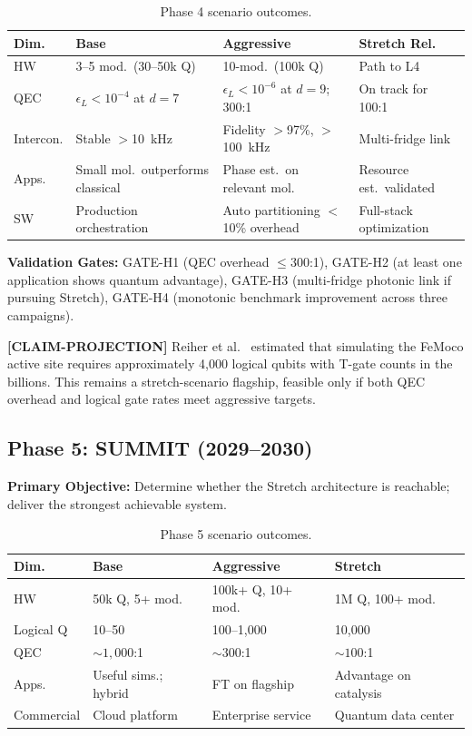 \documentclass[conference]{IEEEtran}
\begin{document}
\begin{table}[H]
\centering
\caption{Phase 4 scenario outcomes.}
\begin{tabular}{@{}l L{2cm} L{2cm} L{2cm}@{}}
\toprule
\textbf{Dim.} & \textbf{Base} & \textbf{Aggressive} & \textbf{Stretch Rel.} \\
\midrule
HW & 3--5 mod.\ (30--50k Q) & 10-mod.\ (100k Q) & Path to L4 \\
QEC & $\epsilon_L < 10^{-4}$ at $d{=}7$ & $\epsilon_L < 10^{-6}$ at $d{=}9$; 300:1 & On track for 100:1 \\
Intercon. & Stable $>$10~kHz & Fidelity $>$97\%, $>$100~kHz & Multi-fridge link \\
Apps. & Small mol.\ outperforms classical & Phase est.\ on relevant mol. & Resource est.\ validated \\
SW & Production orchestration & Auto partitioning $<$10\% overhead & Full-stack optimization \\
\bottomrule
\end{tabular}
\end{table}

\textbf{Validation Gates:} GATE-H1 (QEC overhead $\leq 300$:1), GATE-H2 (at least one application shows quantum advantage), GATE-H3 (multi-fridge photonic link if pursuing Stretch), GATE-H4 (monotonic benchmark improvement across three campaigns).

\textbf{[CLAIM-PROJECTION]} Reiher et al.~\cite{reiher2017} estimated that simulating the FeMoco active site requires approximately 4,000 logical qubits with T-gate counts in the billions. This remains a stretch-scenario flagship, feasible only if both QEC overhead and logical gate rates meet aggressive targets.

\subsection{Phase 5: SUMMIT (2029--2030)}

\textbf{Primary Objective:} Determine whether the Stretch architecture is reachable; deliver the strongest achievable system.

\begin{table}[H]
\centering
\caption{Phase 5 scenario outcomes.}
\begin{tabular}{@{}l L{2cm} L{2cm} L{2cm}@{}}
\toprule
\textbf{Dim.} & \textbf{Base} & \textbf{Aggressive} & \textbf{Stretch} \\
\midrule
HW & 50k Q, 5+ mod. & 100k+ Q, 10+ mod. & 1M Q, 100+ mod. \\
Logical Q & 10--50 & 100--1,000 & 10,000 \\
QEC & ${\sim}1{,}000$:1 & ${\sim}300$:1 & ${\sim}100$:1 \\
Apps. & Useful sims.; hybrid & FT on flagship & Advantage on catalysis \\
Commercial & Cloud platform & Enterprise service & Quantum data center \\
\bottomrule
\end{tabular}
\end{table}
\end{document}
